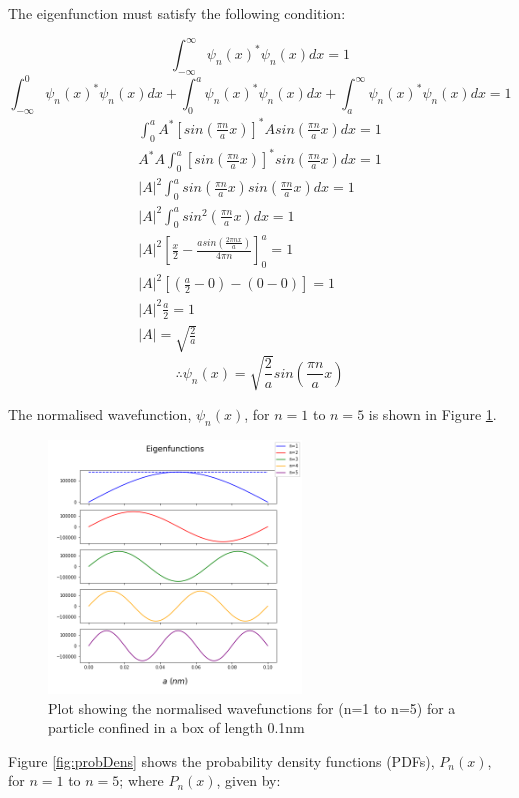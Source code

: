 The eigenfunction must satisfy the following condition:

$$\int_{ -\infty}^{\infty}\psi_n (x)^{*}\psi_n (x)dx = 1$$
$$\int_{ -\infty}^{0}\psi_n (x)^{*}\psi_n (x)dx +\int_{0}^{a}\psi_n (x)^{*}\psi_n (x)dx + \int_{ a}^{\infty}\psi_n (x)^{*}\psi_n (x)dx= 1$$
\begin{align*}
\int_{ 0}^{a} A^{*} [sin(\frac{\pi n}{a}x)]^{*}A sin(\frac{\pi n}{a}x)dx = 1\\
A^{*}A\int_{ 0}^{a} [sin(\frac{\pi n}{a}x)]^{*}sin(\frac{\pi n}{a}x)dx = 1\\
\left | A \right |^2 \int_{ 0}^{a} sin(\frac{\pi n}{a}x) sin(\frac{\pi n}{a}x)dx = 1\\
\left | A \right |^2 \int_{ 0}^{a} sin^{2}(\frac{\pi n}{a}x)dx = 1\\
\left | A \right |^2 \left[\frac{x}{2}-\frac{asin(\frac{2 \pi nx}{a})}{4 \pi n}\right]_0^a= 1\\
\left | A \right |^2 [(\frac{a}{2}-0)-(0-0)]= 1\\
\left | A \right |^2 \frac{a}{2}= 1\\
\left | A \right | = \sqrt{\frac{2}{a}}
\end{align*}
$$\therefore \psi_n (x) = \sqrt{\frac{2}{a}} sin(\frac{\pi n}{a}x)$$

The normalised wavefunction, $\psi_n (x)$, for $n=1$ to $n=5$ is shown in Figure \ref{fig:normWave}.
\begin{figure}[h]
    \centering
    \includegraphics[width=0.6\textwidth]{lab1/images/normalisedWavefunction.png}
    \caption{Plot showing the normalised wavefunctions for (n=1 to n=5) for a particle confined in a box of length 0.1nm}
    \label{fig:normWave}
\end{figure}

Figure \ref{fig:probDens} shows the probability density functions (PDFs), $P_n(x)$, for $n=1$ to $n=5$; where $P_n (x)$, given by:

